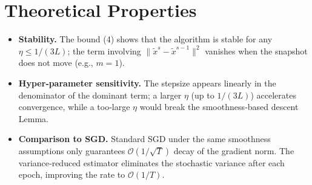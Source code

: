 \documentclass{article}
\begin{document}
\section*{Theoretical Properties}
\begin{itemize}
\item \textbf{Stability.} The bound (4) shows that the algorithm is stable for any $\eta\le 1/(3L)$; the term involving $\|\tilde{x}^{s}-\tilde{x}^{s-1}\|^{2}$ vanishes when the snapshot does not move (e.g., $m=1$).
\item \textbf{Hyper‑parameter sensitivity.} The stepsize appears linearly in the denominator of the dominant term; a larger $\eta$ (up to $1/(3L)$) accelerates convergence, while a too‑large $\eta$ would break the smoothness‑based descent Lemma.
\item \textbf{Comparison to SGD.} Standard SGD under the same smoothness assumptions only guarantees $\mathcal{O}(1/\sqrt{T})$ decay of the gradient norm. The variance‑reduced estimator eliminates the stochastic variance after each epoch, improving the rate to $\mathcal{O}(1/T)$.
\end{itemize}
\end{document}
